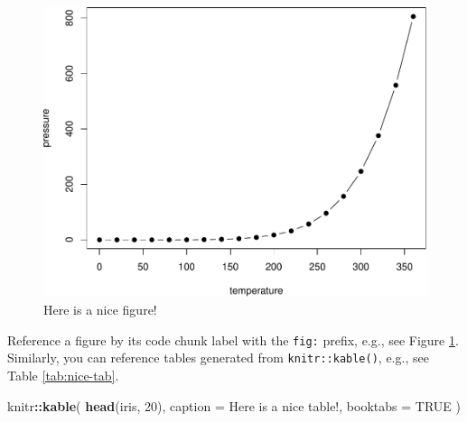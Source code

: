 \documentclass[
]{book}
\newenvironment{Shaded}{\begin{snugshade}}{\end{snugshade}}
\newcommand{\AttributeTok}[1]{\textcolor[rgb]{0.13,0.29,0.53}{#1}}
\newcommand{\ConstantTok}[1]{\textcolor[rgb]{0.56,0.35,0.01}{#1}}
\newcommand{\DecValTok}[1]{\textcolor[rgb]{0.00,0.00,0.81}{#1}}
\newcommand{\FunctionTok}[1]{\textcolor[rgb]{0.13,0.29,0.53}{\textbf{#1}}}
\newcommand{\NormalTok}[1]{#1}
\newcommand{\SpecialCharTok}[1]{\textcolor[rgb]{0.81,0.36,0.00}{\textbf{#1}}}
\newcommand{\StringTok}[1]{\textcolor[rgb]{0.31,0.60,0.02}{#1}}
\begin{document}
\begin{figure}

{\centering \includegraphics[width=0.8\linewidth]{bookdown-demo_files/figure-latex/nice-fig-1} 

}

\caption{Here is a nice figure!}\label{fig:nice-fig}
\end{figure}

Reference a figure by its code chunk label with the \texttt{fig:} prefix, e.g., see Figure \ref{fig:nice-fig}. Similarly, you can reference tables generated from \texttt{knitr::kable()}, e.g., see Table \ref{tab:nice-tab}.

\begin{Shaded}
\begin{Highlighting}[]
\NormalTok{knitr}\SpecialCharTok{::}\FunctionTok{kable}\NormalTok{(}
  \FunctionTok{head}\NormalTok{(iris, }\DecValTok{20}\NormalTok{), }\AttributeTok{caption =} \StringTok{\textquotesingle{}Here is a nice table!\textquotesingle{}}\NormalTok{,}
  \AttributeTok{booktabs =} \ConstantTok{TRUE}
\NormalTok{)}
\end{Highlighting}
\end{Shaded}
\end{document}
